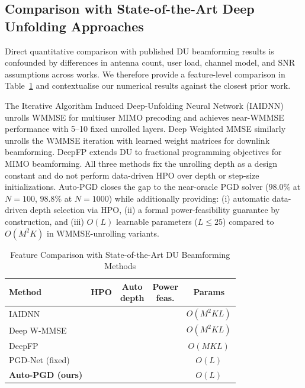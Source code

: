 \documentclass[conference,11pt]{IEEEtran}
\newcommand{\cmark}{\ding{51}}
\newcommand{\xmark}{\ding{55}}
\begin{document}
\subsection{Comparison with State-of-the-Art Deep Unfolding Approaches}

Direct quantitative comparison with published DU beamforming results is confounded by differences in antenna count, user load, channel model, and SNR assumptions across works. We therefore provide a feature-level comparison in Table~\ref{tab:sota} and contextualise our numerical results against the closest prior work.

The Iterative Algorithm Induced Deep-Unfolding Neural Network (IAIDNN) \cite{hu2020deepunfolding} unrolls WMMSE for multiuser MIMO precoding and achieves near-WMMSE performance with 5--10 fixed unrolled layers. Deep Weighted MMSE \cite{pellaco2021deep} similarly unrolls the WMMSE iteration with learned weight matrices for downlink beamforming. DeepFP \cite{zhu2026deepfp} extends DU to fractional programming objectives for MIMO beamforming. All three methods fix the unrolling depth as a design constant and do not perform data-driven HPO over depth or step-size initializations. Auto-PGD closes the gap to the near-oracle PGD solver ($98.0\%$ at $N{=}100$, $98.8\%$ at $N{=}1000$) while additionally providing: (i) automatic data-driven depth selection via HPO, (ii) a formal power-feasibility guarantee by construction, and (iii) $O(L)$ learnable parameters ($L\leq 25$) compared to $O(M^2 K)$ in WMMSE-unrolling variants.

\begin{table}[htbp]
\caption{Feature Comparison with State-of-the-Art DU Beamforming Methods}
\label{tab:sota}
\begin{center}
\begin{tabular}{l c c c c}
\toprule
Method & HPO & \makecell{Auto\\depth} & \makecell{Power\\feas.} & Params \\
\midrule
IAIDNN \cite{hu2020deepunfolding}         & \xmark & \xmark & \xmark & $O(M^2 K L)$ \\
Deep W-MMSE \cite{pellaco2021deep}        & \xmark & \xmark & \xmark & $O(M^2 K L)$ \\
DeepFP \cite{zhu2026deepfp}              & \xmark & \xmark & \xmark & $O(M K L)$ \\
PGD-Net (fixed)                          & \xmark & \xmark & \cmark & $O(L)$ \\
\textbf{Auto-PGD (ours)}                 & \cmark & \cmark & \cmark & $O(L)$ \\
\bottomrule
\end{tabular}
\end{center}
\end{table}
\end{document}
